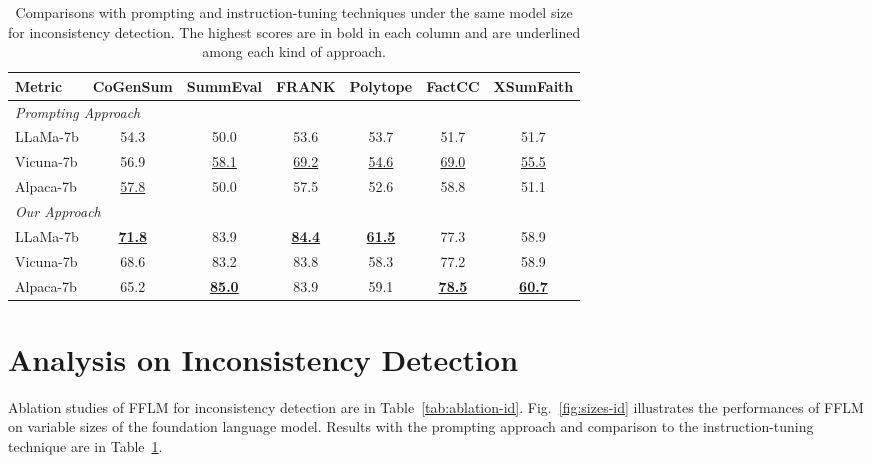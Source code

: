 \begin{table}[h!]
	\scriptsize
	\centering
	\begin{tabular}{l|cccccc}
		\toprule[1pt]
		Metric & CoGenSum & SummEval & FRANK & Polytope & FactCC & XSumFaith \\
		
		\hline
		\multicolumn{7}{l}{\textit{Prompting Approach}} \\
		LLaMa-7b &  54.3 & 50.0 & 53.6 & 53.7 & 51.7 & 51.7 \\
		Vicuna-7b & 56.9 & \underline{58.1} & \underline{69.2} & \underline{54.6} & \underline{69.0} & \underline{55.5}\\
		Alpaca-7b & \underline{57.8} & 50.0 & 57.5 & 52.6 & 58.8 & 51.1 \\
		\hline
		\multicolumn{7}{l}{\textit{Our Approach}} \\
		LLaMa-7b &  \underline{\textbf{71.8}} & 83.9 & \underline{\textbf{84.4}} & \underline{\textbf{61.5}} & 77.3 & 58.9 \\
		Vicuna-7b & 68.6 & 83.2 & 83.8 & 58.3 & 77.2 & 58.9 \\
		Alpaca-7b & 65.2 & \underline{\textbf{85.0}} & 83.9 & 59.1 & \underline{\textbf{78.5}} & \underline{\textbf{60.7}} \\
		\bottomrule[1pt]
	\end{tabular}
	\caption{Comparisons with prompting and instruction-tuning techniques under the same model size for inconsistency detection. The highest scores are in bold in each column and are underlined among each kind of approach.}
	\label{tab:prompt-id}
\end{table}


\section{Analysis on Inconsistency Detection}
\label{sec:appendix}

Ablation studies of FFLM for inconsistency detection are in Table~\ref{tab:ablation-id}. 
Fig.~\ref{fig:sizes-id} illustrates the performances of FFLM on variable sizes of the foundation language model.
Results with the prompting approach and comparison to the instruction-tuning technique are in Table~\ref{tab:prompt-id}.




